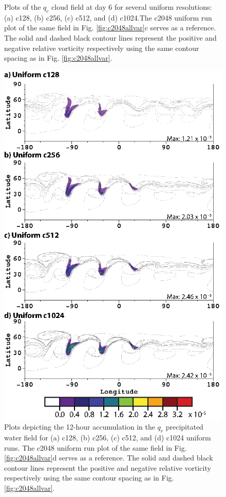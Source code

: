 \begin{figure}
   \caption{Plots of the $q_c$ cloud field at day 6 for several 
   uniform resolutions: (a) c128, (b) c256, (c) c512, and (d) c1024.The c2048 uniform run
   plot of the same field in Fig. \ref{fig:c2048allvar}c serves as a reference. 
   The solid and dashed black contour
   lines represent the positive and negative relative vorticity respectively using the
   same contour spacing as in Fig. \ref{fig:c2048allvar}.
   }
   \label{fig:uniformqc}
\end{figure}

\begin{figure}
   \centerline{%
   \noindent
   \includegraphics[height=.9\textheight]{Chap2/A_qrdt_uniform-01}}
   \caption{Plots depicting the 12-hour accumulation in the $q_r$ precipitated water field for
   (a) c128, (b) c256, (c) c512, and (d) c1024 uniform runs. The c2048 uniform run
   plot of the same field in Fig. \ref{fig:c2048allvar}d serves as a reference.
   The solid and dashed black contour
   lines represent the positive and negative relative vorticity respectively using the
   same contour spacing as in Fig. \ref{fig:c2048allvar}.
      }
   \label{fig:uniformqrdt}
\end{figure}

